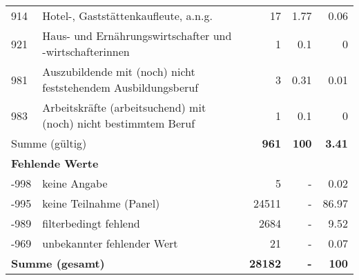 \begin{longtable}{lXrrr}
        914 & \multicolumn{1}{X}{Hotel-, Gaststättenkaufleute, a.n.g.} & %
          \num{17} &
          \num[round-mode=places,round-precision=2]{1.77} &
          \num[round-mode=places,round-precision=2]{0.06} \\

        921 & \multicolumn{1}{X}{Haus- und Ernährungswirtschafter und -wirtschafterinnen} & %
          \num{1} &
          \num[round-mode=places,round-precision=2]{0.1} &
          \num[round-mode=places,round-precision=2]{0} \\

        981 & \multicolumn{1}{X}{Auszubildende mit (noch) nicht feststehendem Ausbildungsberuf} & %
          \num{3} &
          \num[round-mode=places,round-precision=2]{0.31} &
          \num[round-mode=places,round-precision=2]{0.01} \\

        983 & \multicolumn{1}{X}{Arbeitskräfte (arbeitsuchend) mit (noch) nicht bestimmtem Beruf} & %
          \num{1} &
          \num[round-mode=places,round-precision=2]{0.1} &
          \num[round-mode=places,round-precision=2]{0} \\

     \midrule
     \multicolumn{2}{l}{Summe (gültig)} &
       \textbf{\num{961}} &
     \textbf{100} &
       \textbf{\num[round-mode=places,round-precision=2]{3.41}} \\
     \multicolumn{5}{l}{\textbf{Fehlende Werte}}\\
       -998 &
       keine Angabe &
         \num{5} &
        - &
         \num[round-mode=places,round-precision=2]{0.02} \\
       -995 &
       keine Teilnahme (Panel) &
         \num{24511} &
        - &
         \num[round-mode=places,round-precision=2]{86.97} \\
       -989 &
       filterbedingt fehlend &
         \num{2684} &
        - &
         \num[round-mode=places,round-precision=2]{9.52} \\
       -969 &
       unbekannter fehlender Wert &
         \num{21} &
        - &
         \num[round-mode=places,round-precision=2]{0.07} \\
     \midrule
     \multicolumn{2}{l}{\textbf{Summe (gesamt)}} &
          \textbf{\num{28182}} &
        \textbf{-} &
        \textbf{100} \\
     \bottomrule
     \end{longtable}
     

